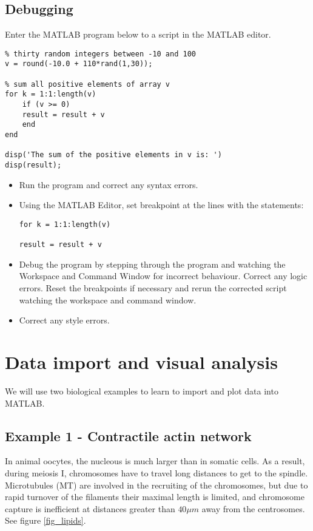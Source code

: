 \documentclass[11pt]{amsart}
\begin{document}
\subsection{Debugging}

Enter the MATLAB program below to a script in the MATLAB editor. 
\color{blue}
\begin{verbatim}
% thirty random integers between -10 and 100
v = round(-10.0 + 110*rand(1,30));

% sum all positive elements of array v
for k = 1:1:length(v)
    if (v >= 0)
	result = result + v
    end 
end 

disp('The sum of the positive elements in v is: ')
disp(result);
\end{verbatim}
\color{black}

\begin{itemize}
\item Run the program and correct any syntax errors.
\item Using the MATLAB Editor, set breakpoint at the lines with the statements:
\color{blue}
\begin{verbatim}
for k = 1:1:length(v)

result = result + v
\end{verbatim}
\color{black}

\item Debug the program by stepping through the program and watching the Workspace and Command Window for incorrect behaviour. Correct any logic errors. Reset the breakpoints if necessary and rerun the corrected script watching the workspace and command window.
\item Correct any style errors.
\end{itemize}

\section{Data import and visual analysis}

We will use two biological examples to learn to import and plot data into MATLAB.

\subsection*{Example 1 - Contractile actin network}

In animal oocytes, the nucleous is much larger than in somatic cells. As a result, during meiosis I, chromosomes have to travel long distances to get to the spindle. Microtubules (MT) are involved in the recruiting of the chromosomes, but due to rapid turnover of the filaments their maximal length is limited, and chromosome capture is inefficient at distances greater than $40\mu m$ away from the centrosomes. See figure \ref{fig_lipids}.
\end{document}
